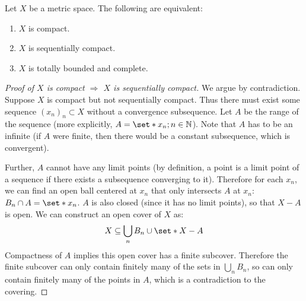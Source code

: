 \documentclass[11pt]{article}
\numberwithin{equation}{section}
\theoremstyle{definition}
\theoremstyle{definition}
\def\Set{\set*}%
\def\ss{\subset}
\def\imp{\Rightarrow}
\newcommand{\1}{\mathbbm 1}
\newcommand{\NN}{\mathbb N}
\begin{document}
\begin{theorem}
	Let $X$ be a metric space. The following are equivalent:
	\begin{enumerate}
		\item $X$ is compact.
		\item $X$ is sequentially compact.
		\item $X$ is totally bounded and complete. 
	\end{enumerate}
\end{theorem}

\begin{proof}[Proof of $X$ is compact $\imp$ $X$ is sequentially compact]
	We argue by contradiction. Suppose $X$ is compact but not sequentially compact. Thus there must exist some sequence $(x_n)_n \ss X$ without a convergence subsequence. Let $A$ be the range of the sequence (more explicitly, $A = \Set{x_n; n \in \NN}$). Note that $A$ has to be an infinite (if $A$ were finite, then there would be a constant subsequence, which is convergent). 

	Further, $A$ cannot have any limit points (by definition, a point is a limit point of a sequence if there exists a subsequence converging to it). Therefore for each $x_n$, we can find an open ball centered at $x_n$ that only intersects $A$ at $x_n$: $B_n \cap A = \Set{x_n}$. $A$ is also closed (since it has no limit points), so that $X-A$ is open. We can construct an open cover of $X$ as:
	\begin{equation}
		X \subseteq \bigcup_{n} B_n \cup \Set{X-A}
	\end{equation}
	Compactness of $A$ implies this open cover has a finite subcover. Therefore the finite subcover can only contain finitely many of the sets in $\bigcup_{n} B_n$, so can only contain finitely many of the points in $A$, which is a contradiction to the covering. 
\end{proof}
\end{document}
